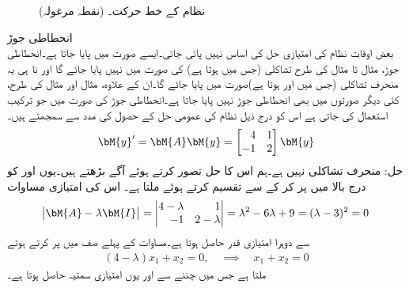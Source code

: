 \begin{figure}
\centering
{}
\caption{نظام  کے خط حرکت۔ (نقطہ مرغولہ)}
\label{شکل_نظام_نقطہ_مرغولہ}
\end{figure}
\quad انحطاطی جوڑ\\
بعض اوقات نظام کی امتیازی حل کی اساس نہیں پائی جاتی۔ایسے صورت میں  پایا جاتا ہے۔انحطاطی جوڑ، مثال  تا مثال  کی طرح تشاکلی  (جس میں  ہوتا ہے) کی صورت میں نہیں پایا جائے گا اور نا ہی یہ منحرف تشاکلی (جس میں  اور  ہوتا ہے)صورت میں پایا جائے  گا۔ان کے علاوہ، مثال  اور مثال  کی طرح،  کئی دیگر صورتوں میں بھی انحطاطی جوڑ نہیں پایا جاتا ہے۔انحطاطی جوڑ کی صورت میں جو ترکیب استعمال کی جاتی ہے اس کو درج ذیل نظام  کی عمومی حل کے حصول کی مدد سے سمجھتے ہیں۔
\begin{align}\label{مساوات_نظام_انحطاطی_جوڑ_الف}
\bM{y}'=\bM{A}\bM{y}=\begin{bmatrix*}[r] 4 & 1 \\ -1 & 2 \end{bmatrix*}\bM{y}
\end{align}
حل: منحرف تشاکلی نہیں ہے۔ہم اس کا حل  تصور کرتے ہوئے آگے بڑھتے ہیں۔یوں  اور  کو درج بالا میں پر کر کے  سے تقسیم کرتے ہوئے  ملتا ہے۔ اس کی امتیازی مساوات
\begin{align*}
\abs{\bM{A}-\lambda \bM{I}}=\begin{vmatrix*}[r] 4-\lambda& 1\\-1&2-\lambda \end{vmatrix*}=\lambda^2-6\lambda+9=(\lambda-3)^2=0
\end{align*}
سے دوہرا امتیازی قدر  حاصل ہوتا ہے۔مساوات  کے پہلے صف میں  پر کرتے ہوئے
\begin{align*}
(4-\lambda)x_1+x_2=0, \quad \implies \quad x_1+x_2=0
\end{align*}
ملتا ہے جس میں  چننے سے  اور یوں امتیازی سمتیہ  حاصل ہوتا ہے۔

